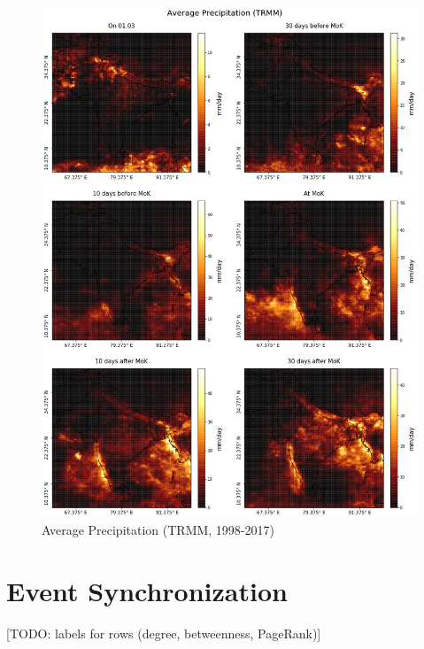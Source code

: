 \begin{figure}[h]
  \centering
  \includegraphics[width=\linewidth]{./99_appendix/img/prec_avg}
  \caption{Average Precipitation (TRMM, 1998-2017)}
  \label{apx:trmm_prec}
\end{figure}

\clearpage
\section{Event Synchronization}
\label{apx:event_sync}

[TODO: labels for rows (degree, betweenness, PageRank)]

